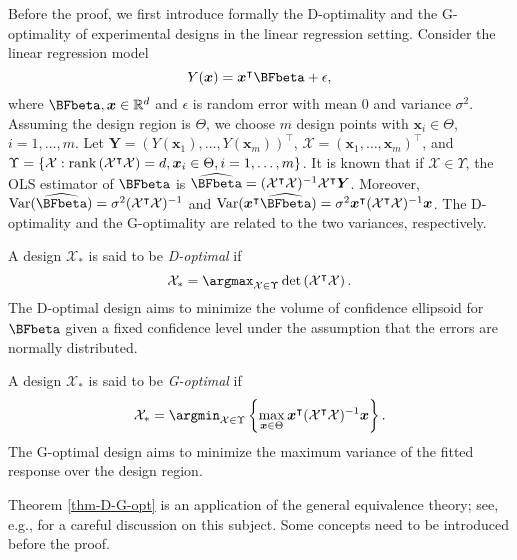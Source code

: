 \documentclass[ijoc,nonblindrev]{informs3}
\def\Var{{\rm Var}}
\def\bx{{\bm x}}
\def\bY{{\bm Y}}
\def\cX{{\mathcal X}}
\begin{document}
Before the proof, we first introduce formally the D-optimality and the G-optimality of experimental designs in the linear regression setting.
Consider the linear regression model
\begin{equation*}
Y(\bx) = \bx^\intercal \BFbeta + \epsilon,
\end{equation*}
where $\BFbeta, \bx \in \mathbb{R}^{d}$ and $\epsilon$ is random error with mean 0 and variance $\sigma^2$.
Assuming the design region is $\Theta$, we choose $m$ design points with $\bx_i \in \Theta$, $i=1,\ldots,m$.
Let $\bY = (Y(\bx_1), \ldots, Y(\bx_m))^\intercal$, $\cX = (\bx_1, \ldots, \bx_m)^\intercal$, and $\Upsilon =  \left\{\cX : \textnormal{rank}\left(\cX^\intercal\cX\right) = d, \bx_i \in \Theta, i=1,\ldots, m\right\}$.
It is known that  if $\cX \in \Upsilon$, the OLS estimator of $\BFbeta$ is $\widehat{\BFbeta} = (\cX^\intercal \cX)^{-1} \cX^\intercal \bY$.
Moreover, $\Var(\widehat{\BFbeta}) = \sigma^2 (\cX^\intercal \cX)^{-1}$ and $\Var(\bx^\intercal \widehat{\BFbeta}) = \sigma^2 \bx^\intercal (\cX^\intercal \cX)^{-1} \bx$. The D-optimality and the G-optimality are related to the two variances, respectively.

A design $\cX_*$ is said to be \emph{D-optimal} if
\begin{equation*}
\cX_* = \argmax_{\cX \in \Upsilon} \det \left( \cX^\intercal \cX \right).
\end{equation*}
The D-optimal design aims to minimize the volume of confidence ellipsoid for $\BFbeta$ given a fixed confidence level under the assumption that the errors are normally distributed.

A design $\cX_*$ is said to be \emph{G-optimal} if
\begin{equation*}
\cX_* = \argmin_{\cX \in \Upsilon} \left\{ \max_{\bx \in \Theta} \bx^\intercal (\cX^\intercal \cX)^{-1} \bx \right\}.
\end{equation*}
The G-optimal design aims to minimize the maximum variance of the fitted response over the design region.



Theorem \ref{thm-D-G-opt} is an application of the general equivalence theory; see, e.g., \citet[Chapter 3]{silvey1980optimal_ec} for a careful discussion on this subject. Some concepts need to be introduced before the proof.
\end{document}
